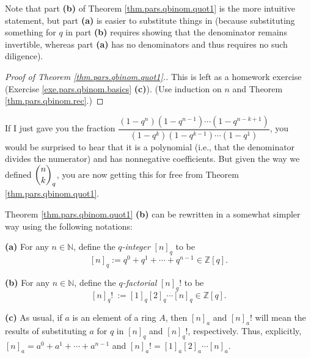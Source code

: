 Note that part \textbf{(b)} of Theorem \ref{thm.pars.qbinom.quot1} is the more
intuitive statement, but part \textbf{(a)} is easier to substitute things in
(because substituting something for $q$ in part \textbf{(b)} requires showing
that the denominator remains invertible, whereas part \textbf{(a)} has no
denominators and thus requires no such diligence).

\begin{proof}
[Proof of Theorem \ref{thm.pars.qbinom.quot1}.]This is left as a homework
exercise (Exercise \ref{exe.pars.qbinom.basics} \textbf{(c)}). (Use induction
on $n$ and Theorem \ref{thm.pars.qbinom.rec}.)
\end{proof}

\begin{remark}
If I just gave you the fraction $\dfrac{\left(  1-q^{n}\right)  \left(
1-q^{n-1}\right)  \cdots\left(  1-q^{n-k+1}\right)  }{\left(  1-q^{k}\right)
\left(  1-q^{k-1}\right)  \cdots\left(  1-q^{1}\right)  }$, you would be
surprised to hear that it is a polynomial (i.e., that the denominator divides
the numerator) and has nonnegative coefficients. But given the way we defined
$\dbinom{n}{k}_{q}$, you are now getting this for free from Theorem
\ref{thm.pars.qbinom.quot1}.
\end{remark}

Theorem \ref{thm.pars.qbinom.quot1} \textbf{(b)} can be rewritten in a
somewhat simpler way using the following notations:

\begin{definition}
\label{def.pars.qbinom.qint}\textbf{(a)} For any $n\in\mathbb{N}$, define the
$q$\emph{-integer }$\left[  n\right]  _{q}$ to be
\[
\left[  n\right]  _{q}:=q^{0}+q^{1}+\cdots+q^{n-1}\in\mathbb{Z}\left[
q\right]  .
\]


\textbf{(b)} For any $n\in\mathbb{N}$, define the $q$\emph{-factorial
}$\left[  n\right]  _{q}!$ to be%
\[
\left[  n\right]  _{q}!\ :=\left[  1\right]  _{q}\left[  2\right]  _{q}%
\cdots\left[  n\right]  _{q}\in\mathbb{Z}\left[  q\right]  .
\]


\textbf{(c)} As usual, if $a$ is an element of a ring $A$, then $\left[
n\right]  _{a}$ and $\left[  n\right]  _{a}!$ will mean the results of
substituting $a$ for $q$ in $\left[  n\right]  _{q}$ and $\left[  n\right]
_{q}!$, respectively. Thus, explicitly, $\left[  n\right]  _{a}=a^{0}%
+a^{1}+\cdots+a^{n-1}$ and $\left[  n\right]  _{a}!=\left[  1\right]
_{a}\left[  2\right]  _{a}\cdots\left[  n\right]  _{a}$.
\end{definition}

